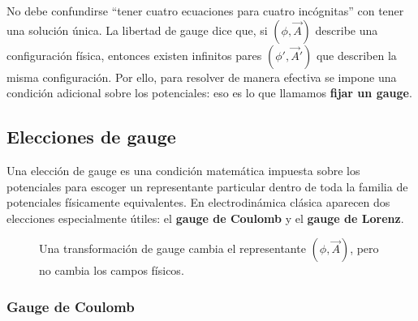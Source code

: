 \documentclass[12pt,a4paper]{article}
\theoremstyle{definition}
\theoremstyle{plain}
\numberwithin{equation}{section}
\theoremstyle{remark}
\newcommand{\E}{\vec{E}}
\newcommand{\B}{\vec{B}}
\begin{document}
\begin{cuidado}
No debe confundirse ``tener cuatro ecuaciones para cuatro incógnitas'' con tener una solución única. La libertad de gauge dice que, si $(\phi,\vec A)$ describe una configuración física, entonces existen infinitos pares $(\phi',\vec A')$ que describen la misma configuración. Por ello, para resolver de manera efectiva se impone una condición adicional sobre los potenciales: eso es lo que llamamos \textbf{fijar un gauge}.
\end{cuidado}

\subsection{Elecciones de gauge}

Una elección de gauge es una condición matemática impuesta sobre los potenciales para escoger un representante particular dentro de toda la familia de potenciales físicamente equivalentes. En electrodinámica clásica aparecen dos elecciones especialmente útiles: el \textbf{gauge de Coulomb} y el \textbf{gauge de Lorenz}.

\begin{figure}[ht!]
\centering
{}
\caption{Una transformación de gauge cambia el representante $(\phi,\vec A)$, pero no cambia los campos físicos.}
\label{fig:gauge-misma-fisica}
\end{figure}

\subsubsection*{Gauge de Coulomb}
\end{document}
